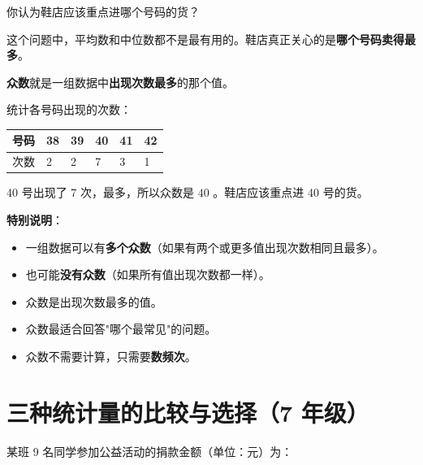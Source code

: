 你认为鞋店应该重点进哪个号码的货？

\begin{understand}


这个问题中，平均数和中位数都不是最有用的。鞋店真正关心的是\textbf{哪个号码卖得最多}。

\textbf{众数}就是一组数据中\textbf{出现次数最多}的那个值。

统计各号码出现的次数：

\begin{center}
\begin{tabular}{llllll}
\toprule
号码 & 38 & 39 & 40 & 41 & 42 \\
\midrule
次数 & 2 & 2 & 7 & 3 & 1 \\
\bottomrule
\end{tabular}
\end{center}


40 号出现了 7 次，最多，所以众数是 $40$ 。鞋店应该重点进 40 号的货。

\textbf{特别说明}：
\begin{itemize}
  \item 一组数据可以有\textbf{多个众数}（如果有两个或更多值出现次数相同且最多）。
  \item 也可能\textbf{没有众数}（如果所有值出现次数都一样）。
\end{itemize}


\end{understand}

\begin{keytakeaway}


\begin{itemize}
  \item 众数是出现次数最多的值。
  \item 众数最适合回答"哪个最常见"的问题。
  \item 众数不需要计算，只需要\textbf{数频次}。
\end{itemize}


\end{keytakeaway}



\section*{三种统计量的比较与选择（7 年级）}


\begin{explore}


某班 9 名同学参加公益活动的捐款金额（单位：元）为：

\end{explore}

